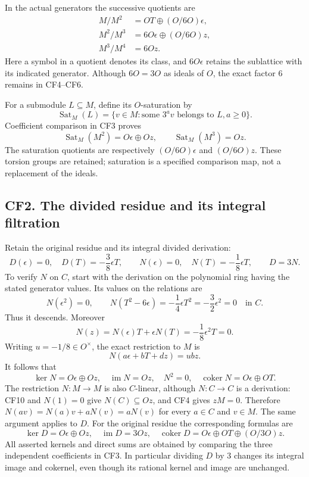 In the actual generators the successive quotients are
\[
 \begin{split}
 M/M^2&=OT\oplus (O/6O)\epsilon,\\
 M^2/M^3&=6O\epsilon\oplus (O/6O)z,\\
 M^3/M^4&=6Oz.
 \end{split}
 \tag{CF6}
\]
Here a symbol in a quotient denotes its class, and \(6O\epsilon\) retains the sublattice with its indicated generator. Although \(6O=3O\) as ideals of \(O\), the exact factor \(6\) remains in CF4--CF6.

For a submodule \(L\subseteq M\), define its \(O\)-saturation by
\[
 \operatorname{Sat}_M(L)=\{v\in M:\text{some }3^a v\text{ belongs to }L, a\geq0\}.
\]
Coefficient comparison in CF3 proves
\[
 \operatorname{Sat}_M(M^2)=O\epsilon\oplus Oz,
 \qquad \operatorname{Sat}_M(M^3)=Oz.
 \tag{CF7}
\]
The saturation quotients are respectively \((O/6O)\epsilon\) and \((O/6O)z\). These torsion groups are retained; saturation is a specified comparison map, not a replacement of the ideals.

\subsection{CF2. The divided residue and its integral filtration}\label{cf2.-the-divided-residue-and-its-integral-filtration}

Retain the original residue and its integral divided derivation:
\[
 D(\epsilon)=0,\quad D(T)=-\frac38\epsilon T,
 \qquad N(\epsilon)=0,\quad N(T)=-\frac18\epsilon T,
 \qquad D=3N.
 \tag{CF8}
\]
To verify \(N\) on \(C\), start with the derivation on the polynomial ring having the stated generator values. Its values on the relations are
\[
 N(\epsilon^2)=0,\qquad
 N(T^2-6\epsilon)=-\frac14\epsilon T^2
 =-\frac32\epsilon^2=0
 \quad\text{in }C.
 \tag{CF9}
\]
Thus it descends. Moreover
\[
 N(z)=N(\epsilon)T+\epsilon N(T)=-\frac18\epsilon^2T=0.
\]
Writing \(u=-1/8\in O^\times\), the exact restriction to \(M\) is
\[
 N(a\epsilon+bT+dz)=u b z.
 \tag{CF10}
\]
It follows that
\[
 \ker N=O\epsilon\oplus Oz,
 \quad\operatorname{im}N=Oz,
 \quad N^2=0,
 \quad\operatorname{coker}N=O\epsilon\oplus OT.
 \tag{CF11}
\]
The restriction \(N:M\to M\) is also \(C\)-linear, although \(N:C\to C\) is a derivation: CF10 and \(N(1)=0\) give \(N(C)\subseteq Oz\), and CF4 gives \(zM=0\). Therefore \(N(av)=N(a)v+aN(v)=aN(v)\) for every \(a\in C\) and \(v\in M\). The same argument applies to \(D\).
For the original residue the corresponding formulas are
\[
 \ker D=O\epsilon\oplus Oz,
 \quad\operatorname{im}D=3Oz,
 \quad\operatorname{coker}D
 =O\epsilon\oplus OT\oplus(O/3O)z.
 \tag{CF12}
\]
All asserted kernels and direct sums are obtained by comparing the three independent coefficients in CF3. In particular dividing \(D\) by \(3\) changes its integral image and cokernel, even though its rational kernel and image are unchanged.

